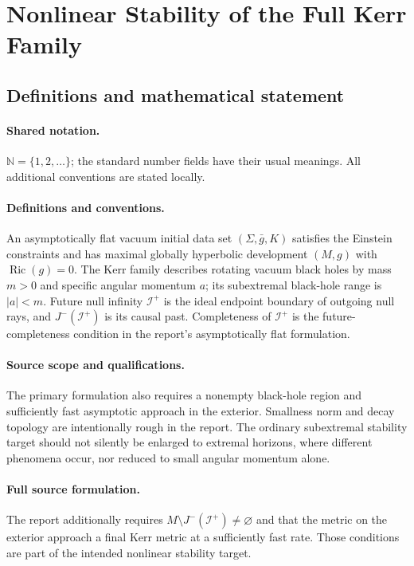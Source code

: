 \documentclass[11pt]{article}
\begin{document}
\section{Nonlinear Stability of the Full Kerr Family}\label{statement}

\subsection{Definitions and mathematical statement}

\paragraph{Shared notation.}$\mathbb N=\{1,2,\ldots\}$; the standard number fields have their usual meanings. All additional conventions are stated locally.


\paragraph{Definitions and conventions.} An asymptotically flat vacuum initial data set $(\Sigma,\bar g,K)$ satisfies the Einstein constraints and has maximal globally hyperbolic development $(M,g)$ with $\operatorname{Ric}(g)=0$. The Kerr family describes rotating vacuum black holes by mass $m>0$ and specific angular momentum $a$; its subextremal black-hole range is $|a|<m$. Future null infinity $\mathcal I^+$ is the ideal endpoint boundary of outgoing null rays, and $J^-(\mathcal I^+)$ is its causal past. Completeness of $\mathcal I^+$ is the future-completeness condition in the report's asymptotically flat formulation.

\paragraph{Source scope and qualifications.} The primary formulation also requires a nonempty black-hole region and sufficiently fast asymptotic approach in the exterior. Smallness norm and decay topology are intentionally rough in the report. The ordinary subextremal stability target should not silently be enlarged to extremal horizons, where different phenomena occur, nor reduced to small angular momentum alone.

\paragraph{Full source formulation.} The report additionally requires $M\setminus J^-(\mathcal I^+)\ne\varnothing$ and that the metric on the exterior approach a final Kerr metric at a sufficiently fast rate. Those conditions are part of the intended nonlinear stability target.
\end{document}

